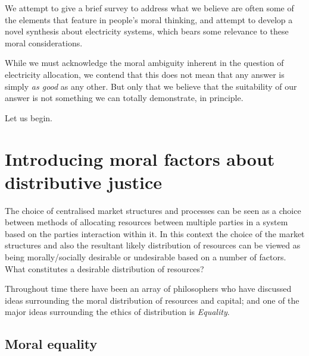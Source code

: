 
We attempt to give a brief survey to address what we believe are often some of the elements that feature in people's moral thinking, and attempt to develop a novel synthesis about electricity systems, which bears some relevance to these moral considerations.

While we must acknowledge the moral ambiguity inherent in the question of electricity allocation, we contend that this does not mean that any answer is simply \textit{as good} as any other. But only that we believe that the suitability of our answer is not something we can totally demonstrate, in principle.

Let us begin.

\section{Introducing moral factors about distributive justice}\label{sec:introducing_moral_factors}

The choice of centralised market structures and processes can be seen as a choice between methods of allocating resources between multiple parties in a system based on the parties interaction within it.
In this context the choice of the market structures and also the resultant likely distribution of resources can be viewed as being morally/socially desirable or undesirable based on a number of factors.
What constitutes a desirable distribution of resources?


Throughout time there have been an array of philosophers who have discussed ideas surrounding the moral distribution of resources and capital; and one of the major ideas surrounding the ethics of distribution is \textit{Equality}.

\subsection{Moral equality}\label{sec_philosophy_moral_equality}

